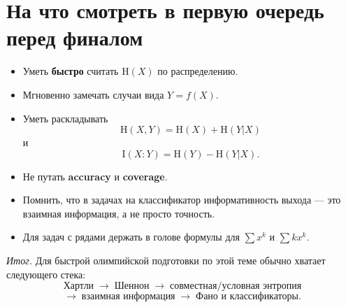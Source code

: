 \documentclass[12pt,a4paper]{article}
\newcommand{\HH}{\mathrm{H}}
\newcommand{\II}{\mathrm{I}}
\begin{document}
\newpage
\section{На что смотреть в первую очередь перед финалом}

\begin{tcolorbox}[colback=codebg, colframe=defblue!80!black, title=\textbf{Чек-лист подготовки}, fonttitle=\bfseries\sffamily, boxrule=1pt]
\begin{itemize}[leftmargin=1.5em]
    \item Уметь \textbf{быстро} считать $\HH(X)$ по распределению.
    \item Мгновенно замечать случаи вида $Y=f(X)$.
    \item Уметь раскладывать
    $$
    \HH(X,Y)=\HH(X)+\HH(Y|X)
    $$
    и
    $$
    \II(X:Y)=\HH(Y)-\HH(Y|X).
    $$
    \item Не путать \textbf{accuracy} и \textbf{coverage}.
    \item Помнить, что в задачах на классификатор информативность выхода --- это взаимная информация, а не просто точность.
    \item Для задач с рядами держать в голове формулы для $\sum x^k$ и $\sum kx^k$.
\end{itemize}
\end{tcolorbox}

\vspace{0.6cm}
\begin{center}
\textit{Итог.}
Для быстрой олимпийской подготовки по этой теме обычно хватает следующего стека:
$$
\text{Хартли} \;\to\; \text{Шеннон} \;\to\; \text{совместная/условная энтропия}
$$
$$
\to\; \text{взаимная информация} \;\to\; \text{Фано и классификаторы}.
$$
\end{center}
\end{document}

